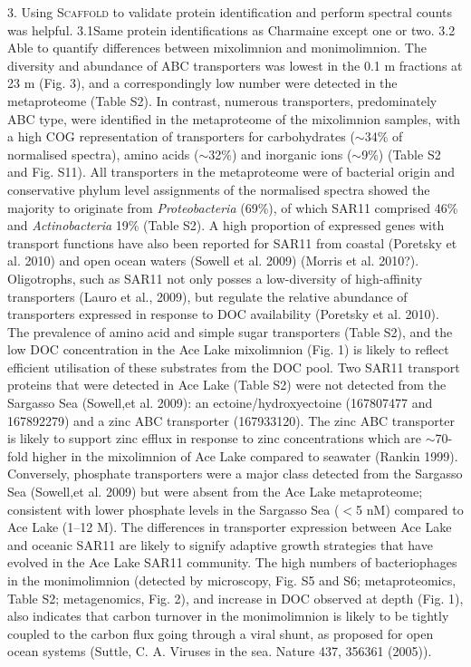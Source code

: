 3. Using \textsc{Scaffold} to validate protein identification and perform spectral counts was helpful. 
3.1Same protein identifications as Charmaine except one or two.
3.2 Able to quantify differences between mixolimnion and monimolimnion.
The diversity and abundance of \ac{ABC} transporters was lowest in the 0.1 \textmu{}m fractions at 23 m (Fig. 3), and a correspondingly low number were detected in the metaproteome (Table S2). 
In contrast, numerous transporters, predominately \ac{ABC} type, were identified in the metaproteome of the mixolimnion samples, with a high \ac{COG} representation of transporters for carbohydrates ($\sim$34\% of normalised spectra), amino acids ($\sim$32\%) and inorganic ions ($\sim$9\%) (Table S2 and Fig. S11).
All transporters in the metaproteome were of bacterial origin and conservative phylum level assignments of the normalised spectra showed the majority to originate from \emph{Proteobacteria} (69\%), 
of which SAR11 comprised 46\% and \emph{Actinobacteria} 19\% (Table S2). 
A high proportion of expressed genes with transport functions have also been reported for SAR11 from coastal (Poretsky et al. 2010) and open ocean waters (Sowell et al. 2009) (Morris et al. 2010?). 
Oligotrophs, such as SAR11 not only posses a low-diversity of high-affinity transporters (Lauro et al., 2009), but regulate the relative abundance of transporters expressed in response to \ac{DOC} availability (Poretsky et al. 2010). 
The prevalence of amino acid and simple sugar transporters (Table S2), and the low \ac{DOC} concentration in the Ace Lake mixolimnion (Fig. 1) is likely to reflect efficient utilisation of these substrates from the \ac{DOC} pool. 
Two SAR11 transport proteins that were detected in Ace Lake (Table S2) were not detected from the Sargasso Sea (Sowell,et al. 2009): an ectoine/hydroxyectoine (167807477 and 167892279) and a zinc \ac{ABC} transporter (167933120). The zinc \ac{ABC} transporter is likely to support zinc efflux in response to zinc concentrations which are $\sim$70-fold higher in the mixolimnion of Ace Lake compared to seawater (Rankin 1999). 
Conversely, phosphate transporters were a major class detected from the Sargasso Sea (Sowell,et al. 2009) but were absent from the Ace Lake metaproteome; consistent with lower phosphate levels in the Sargasso Sea ($<$5 nM) compared to Ace Lake (1--12 \textmu{}M). The differences in transporter expression between Ace Lake and oceanic SAR11 are likely to signify adaptive growth strategies that have evolved in the Ace Lake SAR11 community.
The high numbers of bacteriophages in the monimolimnion (detected by microscopy, Fig. S5 and S6; metaproteomics, Table S2; metagenomics, Fig. 2), and increase in \ac{DOC} observed at depth (Fig. 1), also indicates that carbon turnover in the monimolimnion is likely to be tightly coupled to the carbon flux going through a viral shunt, as proposed for open ocean systems (Suttle, C. A. Viruses in the sea. Nature 437, 356361 (2005)). 
